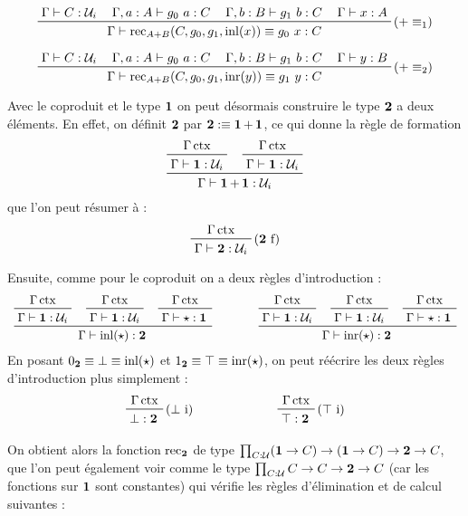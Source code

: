 \documentclass[../../rapport.tex]{subfiles}
\begin{document}
  $$
  \prfinterspace=1.2em
  \prftree[r]{($+ \equiv_1$)}{\Gamma \vdash C : \U_i}{\Gamma, a : A \vdash g_0\ a : C}{\Gamma, b : B \vdash g_1\ b : C}{\Gamma \vdash x : A}
    {\Gamma \vdash \rec_{A+B}(C, g_0, g_1, \inl(x)) \equiv g_0\ x : C}
  $$

  $$
  \prfinterspace=1.2em
  \prftree[r]{($+ \equiv_2$)}{\Gamma \vdash C : \U_i}{\Gamma, a : A \vdash g_0\ a : C}{\Gamma, b : B \vdash g_1\ b : C}{\Gamma \vdash y : B}
    {\Gamma \vdash \rec_{A+B}(C, g_0, g_1, \inr(y)) \equiv g_1\ y : C}
  $$

  \begin{example}[Le type $\2$]
    \label{ex:type_2}
    Avec le coproduit et le type $\operatorname{\textbf{1}}$ on peut désormais construire le type $\2$ a deux éléments.
    En effet, on définit $\2$ par $\operatorname{\textbf{2}} :\equiv \operatorname{\textbf{1}} + \operatorname{\textbf{1}}$, ce qui donne la règle de formation
    $$
    \prfinterspace=1.2em
    \prftree{\prftree{\Gamma \ctx}{\Gamma \vdash \1 : \U_i}}{\prftree{\Gamma \ctx}{\Gamma \vdash \1 : \U_i}}
      {\Gamma \vdash \1 + \1 : \U_i}
    $$
    que l'on peut résumer à :
    $$
    \prftree[r]{($\2$ f)}{\Gamma \ctx}{\Gamma \vdash \2 : \U_i}
    $$

    Ensuite, comme pour le coproduit on a deux règles d'introduction :
    $$
    \prfinterspace=1.2em
    \begin{array}{cc}
      \prftree{\prftree{\Gamma \ctx}{\Gamma \vdash \1 : \U_i}}
	{\prftree{\Gamma \ctx}{\Gamma \vdash \1 : \U_i}}
	{\prftree{\Gamma \ctx}{\Gamma \vdash \star : \1}}
	{\Gamma \vdash \inl(\star) : \2} \hspace{1cm}
      &\prftree{\prftree{\Gamma \ctx}{\Gamma \vdash \1 : \U_i}}
	{\prftree{\Gamma \ctx}{\Gamma \vdash \1 : \U_i}}
	{\prftree{\Gamma \ctx}{\Gamma \vdash \star : \1}}
	  {\Gamma \vdash \inr(\star) : \2}
    \end{array}
    $$
    En posant $0_{\operatorname{\textbf{2}}} \equiv \bot \equiv \operatorname{inl}(\star)$ et $1_{\operatorname{\textbf{2}}} \equiv \top \equiv \operatorname{inr}(\star)$,
    on peut réécrire les deux règles d'introduction plus simplement :
    $$
    \begin{array}{cc}
      \prftree[r]{($\bot$ i)}{\Gamma \ctx}{\bot : \2} \hspace{2cm}
      & \prftree[r]{($\top$ i)}{\Gamma \ctx}{\top : \2}
    \end{array}
    $$

    On obtient alors la fonction $\operatorname{rec}_{\operatorname{\textbf{2}}}$ de type $\prod_{C : \mathcal U}(\operatorname{\textbf{1}} \rightarrow C) \rightarrow (\operatorname{\textbf{1}} \rightarrow C) \rightarrow \operatorname{\textbf{2}} \rightarrow C$,
    que l'on peut également voir comme le type $\prod_{C:\mathcal U}C \rightarrow C \rightarrow \operatorname{\textbf{2}} \rightarrow C$ (car les fonctions sur $\operatorname{\textbf{1}}$ sont constantes)
    qui vérifie les règles d'élimination et de calcul suivantes :


\end{example}
\end{document}
